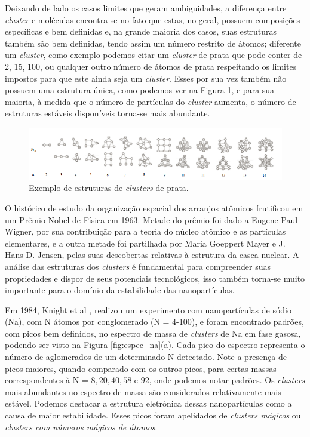 Deixando de lado os casos limites que geram ambiguidades, a diferença entre \textit{cluster} e moléculas encontra-se no fato que estas, no geral, possuem composições específicas e bem definidas e, na grande maioria dos casos, suas estruturas também são bem definidas, tendo  assim um número restrito de átomos; diferente um \textit{cluster}, como exemplo podemos citar um \textit{cluster} de prata que pode conter de 2, 15, 100, ou qualquer outro número de átomos de prata respeitando os limites impostos para que este ainda seja um \textit{cluster}. Esses por sua vez também não possuem uma estrutura única, como podemos ver na Figura \ref{fig:estrutura_cluster_ag}, e para sua maioria, à medida que o número de partículas do \textit{cluster} aumenta, o número de estruturas estáveis disponíveis torna-se mais abundante. 

\begin{figure}
  \centering
  \includegraphics[width=1\textwidth]{images/clusters/estrutura_cluster_ag}
  \caption{ Exemplo de estruturas de \textit{clusters} de prata.\cite{dissertacao_anderson}  }
  \label{fig:estrutura_cluster_ag}
\end{figure}


O histórico de estudo da organização espacial dos arranjos atômicos frutificou em um Prêmio Nobel de Física em 1963. Metade do prêmio foi dado a Eugene Paul Wigner, por sua contribuição para a teoria do núcleo atômico e as partículas elementares,  e a outra metade foi partilhada por Maria Goeppert Mayer e J. Hans D. Jensen, pelas suas descobertas relativas à estrutura da casca nuclear. A análise das estruturas dos \textit{clusters} é fundamental para compreender suas propriedades e  dispor de seus potenciais tecnológicos, isso também torna-se muito importante para o domínio da estabilidade das nanopartículas. 



Em 1984, Knight et al \cite{electronic_Shell_sodium}, realizou um experimento com nanopartículas de sódio (Na), com N átomos por conglomerado (N = 4-100), e foram encontrado padrões, com picos bem definidos, no espectro de massa de \textit{clusters} de Na em fase gasosa, podendo ser visto na Figura \ref{fig:espec_na}(a). Cada pico do espectro representa o número de 
aglomerados de um determinado N detectado. Note a presença de picos maiores, quando comparado com os outros picos, para certas massas correspondentes à N = $8, 20, 40, 58$ e $92$, onde podemos notar padrões. Os \textit{clusters} mais abundantes
no espectro de massa são considerados relativamente mais estável. Podemos destacar a estrutura eletrônica dessas nanopartículas como a causa de maior estabilidade. Esses picos foram apelidados de \textit{clusters mágicos} ou \textit{clusters com números mágicos de átomos}.




